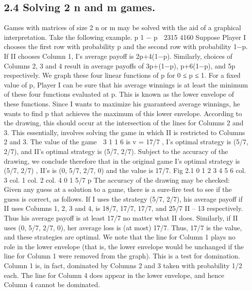 \documentclass[]{report}
\begin{document}
\subsection{2.4 Solving 2 \times n and m  games.} Games with matrices of size 2 \times n or m 
may be solved with the aid of a graphical interpretation. Take the following example.
p
1 − p
 2315
4160
Suppose Player I chooses the first row with probability p and the second row with probability
1−p. If II chooses Column 1, I’s average payoff is 2p+4(1−p). Similarly, choices of
Columns 2, 3 and 4 result in average payoffs of 3p+(1−p), p+6(1−p), and 5p respectively.
We graph these four linear functions of p for 0 ≤ p ≤ 1. For a fixed value of p, Player I can
be sure that his average winnings is at least the minimum of these four functions evaluated
at p. This is known as the lower envelope of these functions. Since I wants to maximize
his guaranteed average winnings, he wants to find p that achieves the maximum of this
lower envelope. According to the drawing, this should occur at the intersection of the lines
for Columns 2 and 3. This essentially, involves solving the game in which II is restricted
to Columns 2 and 3. The value of the game  3 1
1 6
is v = 17/7 , I’s optimal strategy is
(5/7, 2/7), and II’s optimal strategy is (5/7, 2/7). Subject to the accuracy of the drawing,
we conclude therefore that in the original game I’s optimal strategy is (5/7, 2/7) , II’s is
(0, 5/7, 2/7, 0) and the value is 17/7.
Fig 2.1
0
1
2
3
4
5
6
col. 3
col. 1
col. 2
col. 4
0 1 5/7 p
The accuracy of the drawing may be checked: Given any guess at a solution to a
game, there is a sure-fire test to see if the guess is correct, as follows. If I uses the strategy
(5/7, 2/7), his average payoff if II uses Columns 1, 2, 3 and 4, is 18/7, 17/7, 17/7, and 25/7
II – 13
respectively. Thus his average payoff is at least 17/7 no matter what II does. Similarly,
if II uses (0, 5/7, 2/7, 0), her average loss is (at most) 17/7. Thus, 17/7 is the value, and
these strategies are optimal.
We note that the line for Column 1 plays no role in the lower envelope (that is, the
lower envelope would be unchanged if the line for Column 1 were removed from the graph).
This is a test for domination. Column 1 is, in fact, dominated by Columns 2 and 3 taken
with probability 1/2 each. The line for Column 4 does appear in the lower envelope, and
hence Column 4 cannot be dominated.
\end{document}
